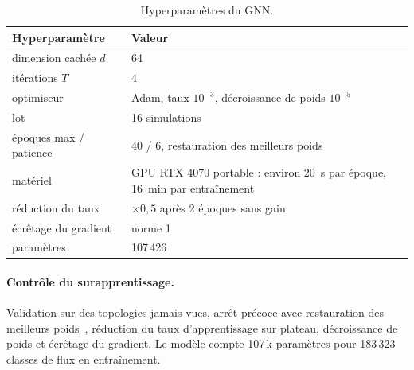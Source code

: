 \documentclass[11pt,a4paper]{report}
\begin{document}
\begin{table}[H]
\centering\small
\begin{tabular}{@{}ll@{}}
\toprule
Hyperparamètre & Valeur\\
\midrule
dimension cachée $d$ & 64\\
itérations $T$ & 4\\
optimiseur & Adam, taux $10^{-3}$, décroissance de poids $10^{-5}$\\
lot & 16 simulations\\
époques max / patience & 40 / 6, restauration des meilleurs poids\\
matériel & GPU RTX 4070 portable : environ 20~s par époque, 16~min par entraînement\\
réduction du taux & $\times0{,}5$ après 2 époques sans gain\\
écrêtage du gradient & norme 1\\
paramètres & 107\,426\\
\bottomrule
\end{tabular}
\caption{Hyperparamètres du GNN.}
\end{table}

\paragraph{Contrôle du surapprentissage.} Validation sur des topologies jamais vues, arrêt précoce avec restauration des meilleurs poids~\cite{prechelt}, réduction du taux d'apprentissage sur plateau, décroissance de poids et écrêtage du gradient. Le modèle compte 107\,k paramètres pour 183\,323 classes de flux en entraînement.



\appendix
\end{document}
